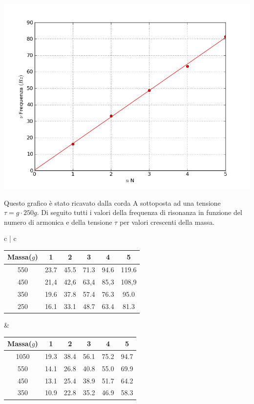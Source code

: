 \begin{center}

\includegraphics[scale=0.5]{../grafici/corda_1armonica}
\end{center}
Questo grafico è stato ricavato dalla corda A sottoposta ad una tensione $\tau=g\cdot250g$. Di seguito tutti i valori della frequenza di risonanza in funzione del numero di armonica e della tensione $\tau$ per valori crescenti della massa.


\begin{center}
\begin{tabular}{c   |  c}
\begin{tabular}{ c | c | c | c | c | c }
Massa($g$) & 1 & 2 & 3 & 4 & 5\\
\midrule
550 & 23.7 & 45.5 & 71.3 & 94.6 & 119.6\\
450 & 21,4 & 42,6 & 63,4 & 85,3 & 108,9\\
350 & 19.6 & 37.8 & 57.4 & 76.3 & 95.0\\
250 & 16.1 & 33.1 & 48.7 & 63.4 & 81.3 \\
\end{tabular}
&
\begin{tabular}{ c | c | c | c | c | c }
Massa($g$) & 1 & 2 & 3 & 4 & 5\\
\midrule
1050 & 19.3 & 38.4 & 56.1 & 75.2 & 94.7 \\
550 & 14.1 & 26.8 & 40.8 & 55.0 & 69.9 \\
450 & 13.1 & 25.4 & 38.9 & 51.7 & 64.2\\
350 & 10.9 & 22.8 & 35.2 & 46.9 & 58.3\\
\end{tabular}

\end{tabular}
\end{center}




